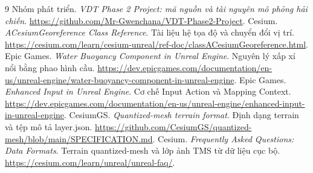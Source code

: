 \documentclass[11pt,a4paper,oneside]{report}
\begin{document}
\renewcommand{\bibname}{Tài liệu tham khảo}\cleardoublepage{}
\begin{thebibliography}{9}
 Nhóm phát triển. \textit{VDT Phase 2 Project: mã nguồn và tài nguyên mô phỏng hải chiến}. \url{https://github.com/Mr-Gwenchana/VDT-Phase2-Project}.
 Cesium. \textit{ACesiumGeoreference Class Reference}. Tài liệu hệ tọa độ và chuyển đổi vị trí. \url{https://cesium.com/learn/cesium-unreal/ref-doc/classACesiumGeoreference.html}.
 Epic Games. \textit{Water Buoyancy Component in Unreal Engine}. Nguyên lý xấp xỉ nổi bằng phao hình cầu. \url{https://dev.epicgames.com/documentation/en-us/unreal-engine/water-buoyancy-component-in-unreal-engine}.
 Epic Games. \textit{Enhanced Input in Unreal Engine}. Cơ chế Input Action và Mapping Context. \url{https://dev.epicgames.com/documentation/en-us/unreal-engine/enhanced-input-in-unreal-engine}.
 CesiumGS. \textit{Quantized-mesh terrain format}. Định dạng terrain và tệp mô tả layer.json. \url{https://github.com/CesiumGS/quantized-mesh/blob/main/SPECIFICATION.md}.
 Cesium. \textit{Frequently Asked Questions: Data Formats}. Terrain quantized-mesh và lớp ảnh TMS từ dữ liệu cục bộ. \url{https://cesium.com/learn/unreal/unreal-faq/}.
\end{thebibliography}
\end{document}

